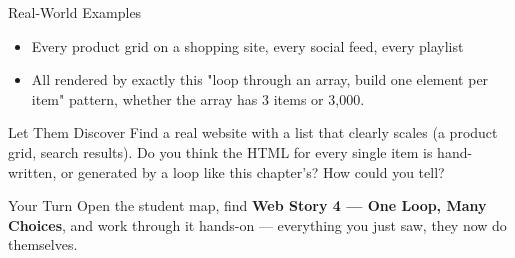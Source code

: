 \documentclass[aspectratio=169]{beamer}
\begin{document}
\begin{frame}{Real-World Examples}
    \large
    \begin{itemize}
        \item Every product grid on a shopping site, every social feed, every playlist
        \item All rendered by exactly this "loop through an array, build one element per item" pattern, whether the array has 3 items or 3,000.
    \end{itemize}
\end{frame}


\begin{frame}{Let Them Discover}
    \Large
    Find a real website with a list that clearly scales (a product grid, search results). Do you think the HTML for every single item is hand-written, or generated by a loop like this chapter's? How could you tell?
\end{frame}

\begin{frame}{Your Turn}
    \Large
    Open the student map, find \textbf{Web Story 4 — One Loop, Many Choices}, and work through it
    hands-on --- everything you just saw, they now do themselves.
\end{frame}
\end{document}
